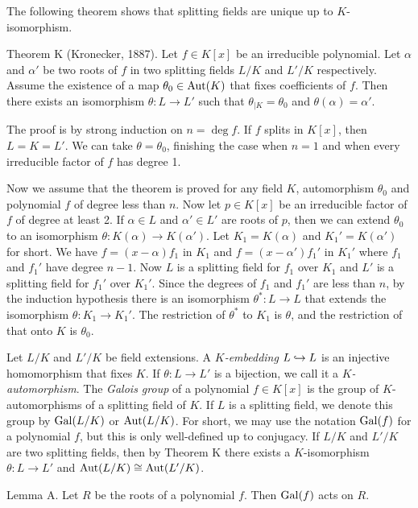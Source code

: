 The following theorem shows that splitting fields are unique up to $K$-isomorphism.

\parenproclaim Theorem K (Kronecker{\rm, 1887}). Let $f\in K[x]$ be an irreducible polynomial. Let $\alpha$ and $\alpha'$ be two roots of $f$ in two splitting fields $L/K$ and $L'/K$ respectively. Assume the existence of a map $\theta_0 \in \mathop {\rm Aut}(K)$ that fixes coefficients of $f$. Then there exists an isomorphism $\theta : L \to L'$ such that $\theta_{|K} = \theta_0$ and $\theta(\alpha) = \alpha'$.

\proof The proof is by strong induction on $n = \deg f$. If $f$ splits in $K[x]$, then $L = K = L'$. We can take $\theta = \theta_0$, finishing the case when $n=1$ and when every irreducible factor of $f$ has degree 1.

Now we assume that the theorem is proved for any field $K$, automorphism $\theta_0$ and polynomial $f$ of degree less than $n$. Now let $p\in K[x]$ be an irreducible factor of $f$ of degree at least 2. If $\alpha\in L$ and $\alpha'\in L'$ are roots of $p$, then we can extend $\theta_0$ to an isomorphism $\theta : K(\alpha) \to K(\alpha')$. Let $K_1 = K(\alpha)$ and ${K_1}' = K(\alpha')$ for short. We have $f = (x-\alpha)f_1$ in $K_1$ and $f = (x-\alpha'){f_1}'$ in ${K_1}'$ where $f_1$ and ${f_1}'$ have degree $n-1$. Now $L$ is a splitting field for $f_1$ over $K_1$ and $L'$ is a splitting field for ${f_1}'$ over ${K_1}'$. Since the degrees of $f_1$ and ${f_1}'$ are less than $n$, by the induction hypothesis there is an isomorphism $\theta^* : L \to L$ that extends the isomorphism $\theta : K_1 \to {K_1}'$. The restriction of $\theta^*$ to $K_1$ is $\theta$, and the restriction of that onto $K$ is $\theta_0$.\slug

Let $L/K$ and $L'/K$ be field extensions. A {\it $K$-embedding} $L \hookrightarrow L$ is an injective homomorphism that fixes $K$. If $\theta : L\to L'$ is a bijection, we call it a {\it $K$-automorphism}. The {\it Galois group} of a polynomial $f\in K[x]$ is the group of $K$-automorphisms of a splitting field of $K$. If $L$ is a splitting field, we denote this group by $\mathop {\rm Gal}(L/K)$ or $\mathop {\rm Aut}(L/K)$. For short, we may use the notation $\mathop {\rm Gal}(f)$ for a polynomial $f$, but this is only well-defined up to conjugacy. If $L/K$ and $L'/K$ are two splitting fields, then by Theorem K there exists a $K$-isomorphism $\theta:L\to L'$ and $\mathop {\rm Aut}(L/K) \cong \mathop {\rm Aut}(L'/K)$.

\proclaim Lemma A. Let $R$ be the roots of a polynomial $f$. Then $\mathop {\rm Gal}(f)$ acts on $R$.

